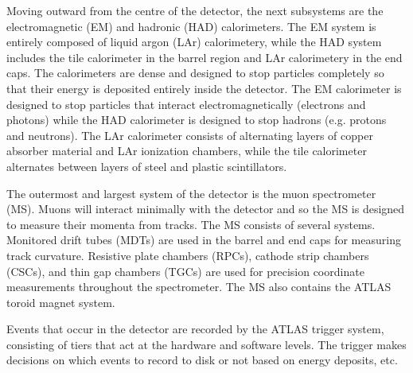 Moving outward from the centre of the detector, the next subsystems are the electromagnetic (EM) and hadronic (HAD) calorimeters. The EM system is entirely composed of liquid argon (LAr) calorimetery, while the HAD system includes the tile calorimeter in the barrel region and LAr calorimetery in the end caps. The calorimeters are dense and designed to stop particles completely so that their energy is deposited entirely inside the detector. The EM calorimeter is designed to stop particles that interact electromagnetically (electrons and photons) while the HAD calorimeter is designed to stop hadrons (e.g. protons and neutrons). The LAr calorimeter consists of alternating layers of copper absorber material and LAr ionization chambers, while the tile calorimeter alternates between layers of steel and plastic scintillators. 

The outermost and largest system of the detector is the muon spectrometer (MS). Muons will interact minimally with the detector and so the MS is designed to measure their momenta from tracks. The MS consists of several systems. Monitored drift tubes (MDTs) are used in the barrel and end caps for measuring track curvature. Resistive plate chambers (RPCs), cathode strip chambers (CSCs), and thin gap chambers (TGCs) are used for precision coordinate measurements throughout the spectrometer. The MS also contains the ATLAS toroid magnet system.

Events that occur in the detector are recorded by the ATLAS trigger system, consisting of tiers that act at the hardware and software levels. The trigger makes decisions on which events to record to disk or not based on energy deposits, etc.

\clearpage

